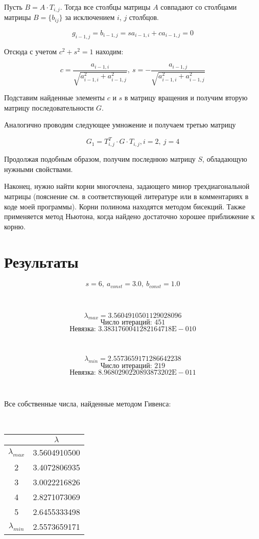 \documentclass[12pt,a4paper]{article}
\begin{document}
Пусть $B = A \cdot T_{i,j}$. Тогда все столбцы матрицы $A$ совпадают со столбцами матрицы $B = \{ b_{ij} \} $ за исключением $i$, $j$ столбцов.

$$
 g_{i-1,j} = b_{i-1,j} = sa_{i-1,i} + ca_{i-1,j} = 0
$$

Отсюда с учетом $c^2 + s^2 = 1$ находим:

$$
 c = \frac{a_{i-1,i}}{\sqrt{a_{i-1,i}^2 + a_{i-1,j}^2}}, \ 
 s = - \frac{a_{i-1,j}}{\sqrt{a_{i-1,i}^2 + a_{i-1,j}^2}}
$$

Подставим найденные элементы $c$ и $s$ в матрицу вращения и получим вторую матрицу последовательности $G$.

Аналогично проводим следующее умножение и получаем третью матрицу

$$
 G_1 = T_{i,j}^T \cdot G \cdot T_{i,j}, i=2, \ j=4
$$ 

Продолжая подобным образом, получим последнюю матрицу $S$, обладающую нужными свойствами.

Наконец, нужно найти корни многочлена, задающего минор трехдиагональной матрицы (пояснение см. в соответствующей литературе или в комментариях в коде моей программы). Корни полинома находятся методом бисекций. Также применяется метод Ньютона, когда найдено достаточно хорошее приближение к корню.

\section{Результаты}

$$ s=6, \ a_{const}=3.0, \ b_{const}=1.0 $$

\

$$ \lambda_{max} = 3.5604910501129028096 $$
$$ \text{Число итераций: } 451 $$
$$ \text{Невязка: } 3.3831760041282164718\text{E}-010 $$

\

$$ \lambda_{min} = 2.5573659171286642238 $$
$$ \text{Число итераций: } 219 $$
$$ \text{Невязка: } 8.9680290220893873202\text{E}-011 $$

\

Все собственные числа, найденные методом Гивенса:

\

\begin{center}


\begin{tabular}{cc}
 & $\lambda$ \\
 \hline
 $\lambda_{max}$  &  3.5604910500 \\
 2  &  3.4072806935 \\
 3  &  3.0022216826 \\
 4  &  2.8271073069 \\
 5  &  2.6455333498 \\
 $\lambda_{min}$  &  2.5573659171
\end{tabular}

\end{center}
\end{document}

